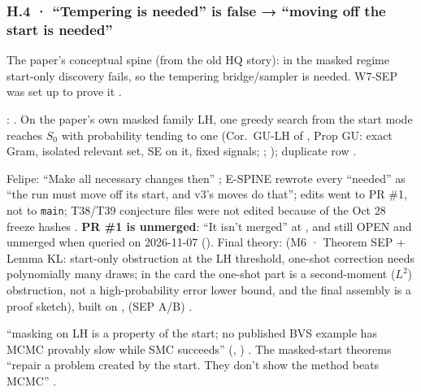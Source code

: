 \subsubsection*{H.4 · ``Tempering is needed'' is false → ``moving off the start is needed''}
\begin{description}[leftmargin=1.3em,style=unboxed,font=\normalfont]
\item[\textbf{Claim.}] The paper's conceptual spine (from the old HQ story): in the masked regime start-only discovery fails, so the tempering bridge/sampler is needed. W7-SEP was set up to prove it .
\item[\textbf{Failed.}] :  . On the paper's own masked family LH, one greedy search from the start mode reaches $S_0$ with probability tending to one (Cor.\ GU-LH of , Prop GU: exact Gram, isolated relevant set, SE on it, fixed signals;  ; ); duplicate row .
\item[\textbf{Replacement.}] Felipe: ``Make all necessary changes then'' ; E-SPINE rewrote every ``needed'' as ``the run must move off its start, and v3's moves do that''; edits went to PR \#1, not to \texttt{main}; T38/T39 conjecture files were not edited because of the Oct 28 freeze hashes . \textbf{PR \#1 is unmerged}: ``It isn't merged'' at , and still OPEN and unmerged when queried on 2026-11-07  (). Final theory:  (M6 · Theorem SEP + Lemma KL: start-only obstruction at the LH threshold, one-shot correction needs polynomially many draws; in the card the one-shot part is a second-moment ($L^2$) obstruction, not a high-probability error lower bound, and the final assembly is a proof sketch), built on ,  (SEP A/B) .
\item[\textbf{Honest scope.}] ``masking on LH is a property of the start; no published BVS example has MCMC provably slow while SMC succeeds'' (, ) . The masked-start theorems ``repair a problem created by the start. They don't show the method beats MCMC'' .
\end{description}


